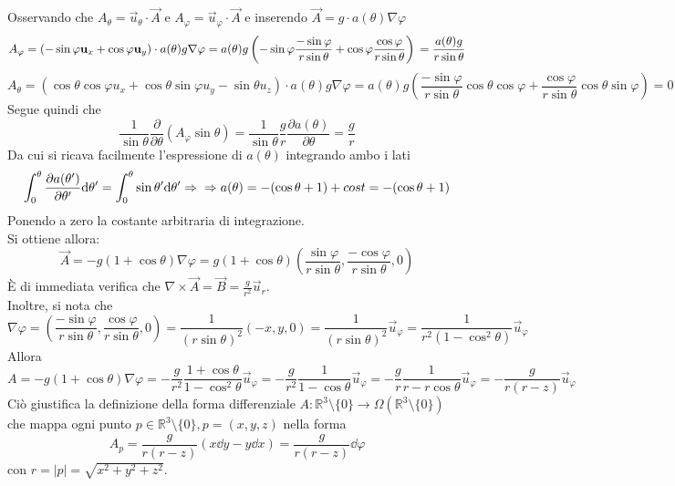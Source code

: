 Osservando che $A_\theta = \vec u _\theta \cdot \vec A $ e
$A_\varphi = \vec u _\varphi \cdot \vec A$ e inserendo $ \vec A = g \cdot a(\theta) \nabla \varphi $
$$
         A_\varphi = (-\sin\varphi \vec u _x + \cos\varphi \vec u _y)
                       \cdot a(\theta) g \nabla \varphi
                = a(\theta)g\left( -\sin\varphi \frac{-\sin\varphi}{r\sin\theta}
                      + \cos\varphi \frac{\cos\varphi}{r\sin\theta}\right)\\
                = \frac{a(\theta)g}{r\sin\theta}
$$
$$         A_\theta = (\cos\theta \cos\varphi u_x + \cos\theta \sin\varphi u_y
                          - \sin\theta u_z) \cdot a(\theta) g \nabla \varphi
                    = a(\theta) g \left( \frac{-\sin\varphi}{r\sin\theta} \cos\theta \cos\varphi
                          + \frac{\cos\varphi}{r\sin\theta} \cos\theta \sin\varphi \right)
                    = 0
$$
Segue quindi che
$$
   \frac{1}{\sin\theta} \frac{\partial}{\partial\theta}(A_\varphi \sin\theta)
      = \frac{1}{\sin\theta} \frac{g}{r} \frac{\partial a(\theta)}{\partial \theta}
      = \frac{g}{r}
$$
Da cui si ricava facilmente l'espressione di $a(\theta)$ integrando ambo i lati
$$
   \int_0 ^\theta \frac{\partial a(\theta')}{\partial \theta'} \dd \theta'
      = \int_0^\theta \sin\theta' \dd \theta' \Rightarrow\\
   \Rightarrow a(\theta) = -(\cos\theta+1) + cost  = -(\cos\theta+1)
$$
Ponendo a zero la costante arbitraria di integrazione.\\
%
Si ottiene allora:
$$
   \boxed{
          \vec A = -g(1 + \cos\theta) \nabla \varphi
                 = g(1 + \cos\theta)\left( \frac{\sin\varphi}{r\sin\theta},
                    \frac{-\cos\varphi}{r\sin\theta},0 \right)
   }
$$
È di immediata verifica che $\nabla \times \vec A = \vec B = \frac{g}{r^2} \vec u _r$.\\
%
Inoltre, si nota che
$$
   \nabla \varphi = \left( \frac{-\sin\varphi}{r\sin\theta},\frac{\cos\varphi}{r\sin\theta},0 \right)
      = \frac{1}{(r\sin\theta)^2}(-x,y,0) = \frac{1}{(r\sin\theta)^2}\vec u _\varphi
      = \frac{1}{r^2(1-\cos^2\theta)} \vec u _\varphi
$$
Allora
$$
   A = -g(1+\cos\theta)\nabla\varphi = -\frac{g}{r^2} \frac{1+\cos\theta}{1-\cos^2\theta} \vec u _\varphi
     = -\frac{g}{r^2} \frac{1}{1-\cos\theta} \vec u _\varphi
     = -\frac{g}{r} \frac{1}{r-r\cos\theta} \vec u _\varphi
     = -\frac{g}{r(r-z)} \vec u _\varphi
$$
Ciò giustifica la definizione della forma differenziale $ A : \mathbb{R}^3 \setminus \{0\}
\to \Omega(\mathbb{R}^3 \setminus \{0\})$ che mappa ogni punto $p \in \mathbb{R}^3 \setminus \{0\} , p = (x,y,z)$ nella forma
$$
    A_p = \frac{g}{r(r-z)}(x \dd  y - y \dd  x) = \frac{g}{r(r-z)} \dd  \varphi
$$
con $r = |p| = \sqrt{x^2+y^2+z^2}$.

